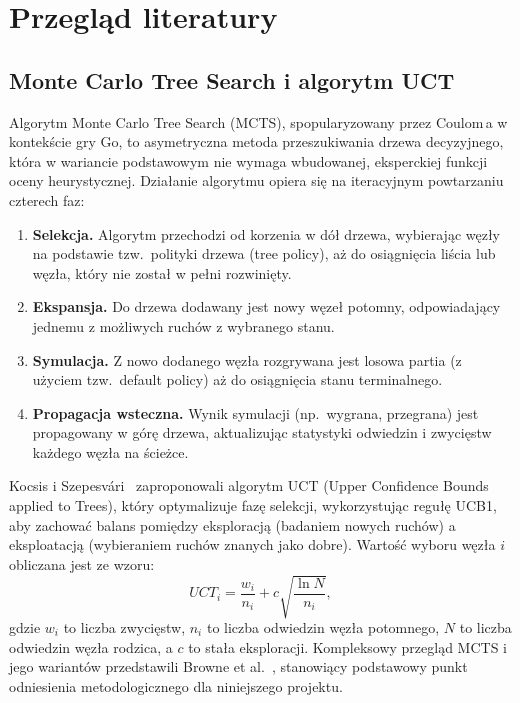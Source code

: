 \section{Przegląd literatury}
\label{sec:literatura}

\subsection{Monte Carlo Tree Search i algorytm UCT}

Algorytm Monte Carlo Tree Search (MCTS), spopularyzowany przez Coulom\,a
\cite{coulom2006efficient} w kontekście gry Go, to asymetryczna metoda
przeszukiwania drzewa decyzyjnego, która w wariancie podstawowym nie wymaga
wbudowanej, eksperckiej funkcji oceny heurystycznej. Działanie algorytmu opiera
się na iteracyjnym powtarzaniu czterech faz:
\begin{enumerate}[nosep]
    \item \textbf{Selekcja.} Algorytm przechodzi od korzenia w dół drzewa,
          wybierając węzły na podstawie tzw.\ polityki drzewa (tree policy),
          aż do osiągnięcia liścia lub węzła, który nie został w pełni rozwinięty.
    \item \textbf{Ekspansja.} Do drzewa dodawany jest nowy węzeł potomny,
          odpowiadający jednemu z możliwych ruchów z wybranego stanu.
    \item \textbf{Symulacja.} Z nowo dodanego węzła rozgrywana jest losowa partia
          (z użyciem tzw.\ default policy) aż do osiągnięcia stanu terminalnego.
    \item \textbf{Propagacja wsteczna.} Wynik symulacji (np.\ wygrana, przegrana)
          jest propagowany w górę drzewa, aktualizując statystyki odwiedzin
          i zwycięstw każdego węzła na ścieżce.
\end{enumerate}

Kocsis i Szepesvári~\cite{kocsis2006bandit} zaproponowali algorytm UCT (Upper
Confidence Bounds applied to Trees), który optymalizuje fazę selekcji,
wykorzystując regułę UCB1, aby zachować balans pomiędzy eksploracją (badaniem
nowych ruchów) a eksploatacją (wybieraniem ruchów znanych jako dobre). Wartość
wyboru węzła $i$ obliczana jest ze wzoru:
\begin{equation}
    UCT_i = \frac{w_i}{n_i} + c \sqrt{\frac{\ln N}{n_i}},
\end{equation}
gdzie $w_i$ to liczba zwycięstw, $n_i$ to liczba odwiedzin węzła potomnego,
$N$ to liczba odwiedzin węzła rodzica, a $c$ to stała eksploracji. Kompleksowy
przegląd MCTS i jego wariantów przedstawili Browne et al.~\cite{browne2012survey},
stanowiący podstawowy punkt odniesienia metodologicznego dla niniejszego projektu.

